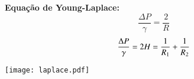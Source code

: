 \documentclass[8pt]{beamer}
\begin{document}
\begin{frame}
\begin{minipage}{0.3\textwidth}
\begin{flushright}
				\end{flushright}
		\end{minipage}
		\begin{minipage}{0.69\textwidth}
			\centering
			\hspace{0.2cm}\textbf{Equação de Young-Laplace:}
			$$ \frac{\Delta P}{\gamma} = \frac{2}{R}$$
			$$ \frac{\Delta P}{\gamma} = 2 H = \frac{1}{R_{\rm 1}} + \frac{1}{R_{\rm 2}}$$
		\end{minipage}
		\begin{minipage}{0.3\textwidth}
				\begin{flushright}
					\texttt{[image: laplace.pdf]}\\
				\end{flushright}
		\end{minipage}
\end{frame}
\end{document}
